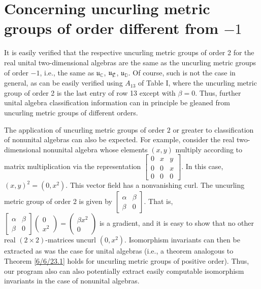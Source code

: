 \documentclass{amsart}
\numberwithin{equation}{section}
\theoremstyle{definition}
\numberwithin{theorem}{section}
\begin{document}
 \section{Concerning uncurling metric groups of order different from $-1$}
It is easily verified that the respective uncurling metric groups of order 2 for the real unital two-dimensional algebras are the same as the uncurling metric groups of order $-1$, i.e., the same as  $\mathfrak{u}_{\mathbb{C}}$, $\mathfrak{u}_{\slashed{\mathbb{C}}}$, $\mathfrak{u}_{\mathbb{D}}$.  Of course, such is not the case in general, as can be easily verified using $A_{13}$ of Table I, where the uncurling metric group of order 2 is the last entry of row 13 except with $\beta=0$.  Thus, further unital algebra classification information can in principle be gleaned from uncurling metric groups of different orders.

The application of uncurling metric groups of order $2$ or greater  to classification of nonunital algebras can also be expected.  For example, consider the real two-dimensional nonunital algebra whose elements $(x,y)$ multiply according to matrix multiplication via the representation
 $\left[
\begin{array}{ccccc}
0 & x & y   \\
0 & 0 & x \\
0 & 0 & 0  
\end{array}
\right] $.  In this case, $(x,y)^2 = (0,x^2)$.  This vector field has a nonvanishing curl.  The uncurling metric group of order 2 is given by $\left[
\begin{array}{ccccc}
\alpha & \beta    \\
\beta & 0   
\end{array}
\right]$.
  That is,  $\left[
\begin{array}{ccccc}
\alpha & \beta    \\
\beta & 0   
\end{array}
\right] \left(
\begin{array}{ccccc}
0   \\
x^2 
\end{array}
\right) =   \left(
\begin{array}{ccccc}
\beta x^2   \\
0 
\end{array}
\right)$ is a gradient, and it is easy to show that no other real $(2\times 2)$-matrices uncurl $(0,x^2)$.   Isomorphism invariants can then be extracted as was the case for unital algebras (i.e., a theorem analogous to Theorem \ref{6/6/23.1} holds for uncurling metric groups of positive order).  Thus, our program also can also potentially extract easily computable isomorphism invariants in the case of nonunital algebras.
 
\end{document}
